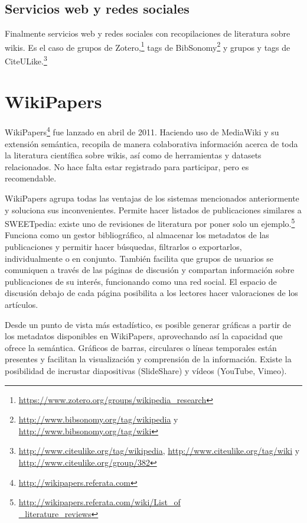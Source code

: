 \documentclass[11pt,twocolumn]{article}
\begin{document}
\subsection{Servicios web y redes sociales}
Finalmente servicios web y redes sociales con recopilaciones de literatura sobre wikis. Es el caso de grupos de Zotero,\footnote{\href{https://www.zotero.org/groups/wikipedia_research}{https://www.zotero.org/groups/wikipedia\_research}} tags de BibSonomy\footnote{\href{http://www.bibsonomy.org/tag/wikipedia}{http://www.bibsonomy.org/tag/wikipedia} y \href{http://www.bibsonomy.org/tag/wiki}{http://www.bibsonomy.org/tag/wiki}} y grupos y tags de CiteULike.\footnote{\href{http://www.citeulike.org/tag/wikipedia}{http://www.citeulike.org/tag/wikipedia}, \href{http://www.citeulike.org/tag/wiki}{http://www.citeulike.org/tag/wiki} y \href{http://www.citeulike.org/group/382}{http://www.citeulike.org/group/382}}

\section{WikiPapers}
WikiPapers\footnote{\href{http://wikipapers.referata.com}{http://wikipapers.referata.com}} fue lanzado en abril de 2011. Haciendo uso de MediaWiki y su extensión semántica, recopila de manera colaborativa información acerca de toda la literatura científica sobre wikis, así como de herramientas y datasets relacionados. No hace falta estar registrado para participar, pero es recomendable.

WikiPapers agrupa todas las ventajas de los sistemas mencionados anteriormente y soluciona sus inconvenientes. Permite hacer listados de publicaciones similares a SWEETpedia: existe uno de revisiones de literatura por poner solo un ejemplo.\footnote{\href{http://wikipapers.referata.com/wiki/List_of_literature_reviews}{http://wikipapers.referata.com/wiki/List\_of\\ \_literature\_reviews}} Funciona como un gestor bibliográfico, al almacenar los metadatos de las publicaciones y permitir hacer búsquedas, filtrarlos o exportarlos, individualmente o en conjunto. También facilita que grupos de usuarios se comuniquen a través de las páginas de discusión y compartan información sobre publicaciones de su interés, funcionando como una red social. El espacio de discusión debajo de cada página posibilita a los lectores hacer valoraciones de los artículos.

Desde un punto de vista más estadístico, es posible generar gráficas a partir de los metadatos disponibles en WikiPapers, aprovechando así la capacidad que ofrece la semántica. Gráficos de barras, circulares o líneas temporales están presentes y facilitan la visualización y comprensión de la información. Existe la posibilidad de incrustar diapositivas (SlideShare) y vídeos (YouTube, Vimeo).
\end{document}
